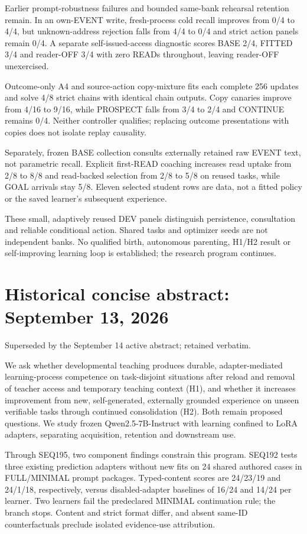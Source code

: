 \documentclass[11pt]{article}
\begin{document}
Earlier prompt-robustness failures and bounded same-bank rehearsal retention
remain. In an own-EVENT write, fresh-process cold recall improves from 0/4 to
4/4, but unknown-address rejection falls from 4/4 to 0/4 and strict action
panels remain 0/4. A separate self-issued-access diagnostic scores BASE 2/4,
FITTED 3/4 and reader-OFF 3/4 with zero READs throughout, leaving reader-OFF
unexercised.

Outcome-only A4 and source-action copy-mixture fits each complete 256 updates
and solve 4/8 strict chains with identical chain outputs. Copy canaries improve
from 4/16 to 9/16, while PROSPECT falls from 3/4 to 2/4 and CONTINUE remains
0/4. Neither controller qualifies; replacing outcome presentations with copies
does not isolate replay causality.

Separately, frozen BASE collection consults externally retained raw EVENT text,
not parametric recall. Explicit first-READ coaching increases read uptake from
2/8 to 8/8 and read-backed selection from 2/8 to 5/8 on reused tasks, while
GOAL arrivals stay 5/8. Eleven selected student rows are data, not a fitted
policy or the saved learner's subsequent experience.

These small, adaptively reused DEV panels distinguish persistence, consultation
and reliable conditional action. Shared tasks and optimizer seeds are not
independent banks. No qualified birth, autonomous parenting, H1/H2 result or
self-improving learning loop is established; the research program continues.

\section*{Historical concise abstract: September 13, 2026}
\noindent Superseded by the September 14 active abstract; retained verbatim.

We ask whether developmental teaching produces durable, adapter-mediated
learning-process competence on task-disjoint situations after reload and
removal of teacher access and temporary teaching context (H1), and whether it
increases improvement from new, self-generated, externally grounded experience
on unseen verifiable tasks through continued consolidation (H2). Both remain
proposed questions. We study frozen Qwen2.5-7B-Instruct with learning confined
to LoRA adapters, separating acquisition, retention and downstream use.

Through SEQ195, two component findings constrain this program. SEQ192 tests
three existing prediction adapters without new fits on 24 shared authored
cases in FULL/MINIMAL prompt packages. Typed-content scores are 24/23/19 and
24/1/18, respectively, versus disabled-adapter baselines of 16/24 and 14/24
per learner. Two learners fail the predeclared MINIMAL continuation rule; the
branch stops. Content and strict format differ, and absent same-ID
counterfactuals preclude isolated evidence-use attribution.
\end{document}
